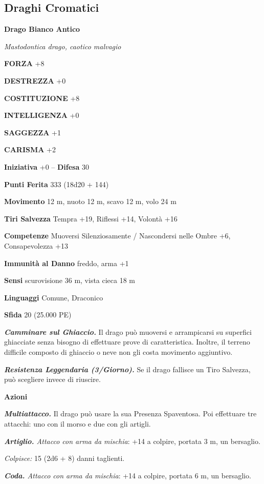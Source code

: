 \begin{multicols}{2}
\subsection{Draghi Cromatici}

\medskip{}\textbf{Drago Bianco Antico}

\emph{Mastodontica drago, caotico malvagio}

\textbf{FORZA} +8

\textbf{DESTREZZA} +0

\textbf{COSTITUZIONE} +8

\textbf{INTELLIGENZA} +0

\textbf{SAGGEZZA} +1

\textbf{CARISMA} +2

\textbf{Iniziativa} +0 -- \textbf{Difesa} 30

\textbf{Punti Ferita} 333 (18d20 + 144)

\textbf{Movimento} 12 m, nuoto 12 m, scavo 12 m, volo 24 m

\textbf{Tiri Salvezza} Tempra +19, Riflessi +14, Volontà +16

\textbf{Competenze} Muoversi Silenziosamente / Nascondersi nelle Ombre +6, Consapevolezza +13

\textbf{Immunità al Danno} freddo, arma +1

\textbf{Sensi} scurovisione 36 m, vista cieca 18 m

\textbf{Linguaggi} Comune, Draconico

\textbf{Sfida} 20 (25.000 PE)

\emph{\textbf{Camminare sul Ghiaccio.}} Il drago può muoversi e arrampicarsi su superfici ghiacciate senza bisogno di effettuare prove di caratteristica. Inoltre, il terreno difficile composto di ghiaccio o neve non gli costa movimento aggiuntivo.

\emph{\textbf{Resistenza Leggendaria (3/Giorno).}} Se il drago fallisce un Tiro Salvezza, può scegliere invece di riuscire.

\textbf{Azioni}

\emph{\textbf{Multiattacco.}} Il drago può usare la sua Presenza Spaventosa. Poi effettuare tre attacchi: uno con il morso e due con gli artigli.

\emph{\textbf{Artiglio.} Attacco con arma da mischia}: +14 a colpire, portata 3 m, un bersaglio.

\emph{Colpisce:} 15 (2d6 + 8) danni taglienti.

\emph{\textbf{Coda.} Attacco con arma da mischia}: +14 a colpire, portata 6 m, un bersaglio.


\end{multicols}
